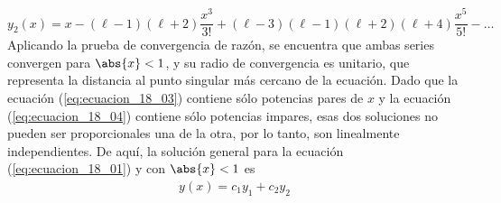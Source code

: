 \begin{equation}
y_{2}(x) = x - (\ell - 1)(\ell + 2) \dfrac{x^{3}}{3!} + (\ell - 3) (\ell - 1)(\ell + 2)(\ell + 4) \dfrac{x^{5}}{5!} - \ldots
\label{eq:ecuacion_18_04}
\end{equation}
Aplicando la prueba de convergencia de razón, se encuentra que ambas series convergen para $\abs{x} < 1$, y su radio de convergencia es unitario, que representa la distancia al punto singular más cercano de la ecuación. Dado que la ecuación (\ref{eq:ecuacion_18_03}) contiene sólo potencias pares de $x$ y la ecuación (\ref{eq:ecuacion_18_04}) contiene sólo potencias impares, esas dos soluciones no pueden ser proporcionales una de la otra, por lo tanto, son linealmente independientes. De aquí, la solución general para la ecuación (\ref{eq:ecuacion_18_01}) y con $\abs{x} < 1$ es
\begin{align*}
y(x) = c_{1} y_{1} + c_{2} y_{2}
\end{align*}
